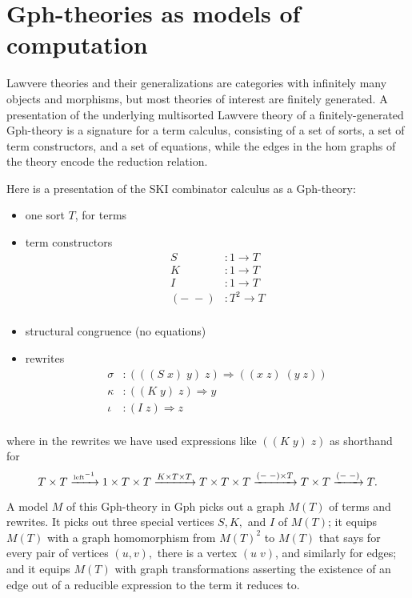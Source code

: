 \documentclass[a4paper,UKenglish]{lipics-v2016}
\begin{document}
\section{Gph-theories as models of computation}

Lawvere theories and their generalizations are categories with infinitely many objects and morphisms, but most theories of interest are finitely generated.  A presentation of the underlying multisorted Lawvere theory of a finitely-generated Gph-theory is a signature for a term calculus, consisting of a set of sorts, a set of term constructors, and a set of equations, while the edges in the hom graphs of the theory encode the reduction relation.

Here is a presentation of the SKI combinator calculus as a Gph-theory:
\begin{itemize}
  \item one sort $T$, for terms
  \item term constructors
  \[\begin{array}{rl}
    S&:1 \to T\\
    K&:1 \to T\\
    I&:1 \to T\\
    (-\; -)&: T^2 \to T\\
  \end{array}\]
  \item structural congruence (no equations)
  \item rewrites
  \[\begin{array}{rl}
    \sigma&:(((S\; x)\; y)\; z) \Rightarrow ((x\; z)\; (y\; z))\\
    \kappa&:((K\; y)\; z) \Rightarrow y\\
    \iota&:(I\; z) \Rightarrow z\\
  \end{array}\]
\end{itemize}
where in the rewrites we have used expressions like $((K\; y)\; z)$ as shorthand for
\[ T\times T \xrightarrow{\mbox{\tiny left}^{-1}} 1\times T \times T \xrightarrow{K \times T \times T} T\times T \times T \xrightarrow{(-\;-)\times T} T\times T \xrightarrow{(-\;-)} T. \]

A model $M$ of this Gph-theory in Gph picks out a graph $M(T)$ of terms and rewrites.  It picks out three special vertices $S,K,$ and $I$ of $M(T)$; it equips $M(T)$ with a graph homomorphism from $M(T)^2$ to $M(T)$ that says for every pair of vertices $(u,v),$ there is a vertex $(u\;v)$, and similarly for edges; and it equips $M(T)$ with graph transformations asserting the existence of an edge out of a reducible expression to the term it reduces to.
\end{document}
